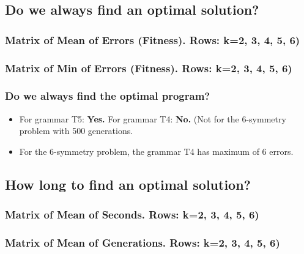 \documentclass[18pt,c]{beamer}
\makeatletter
\let\beamer@writeslidentry@miniframeson=\beamer@writeslidentry
\newcommand*{\miniframeson}{\let\beamer@writeslidentry=\beamer@writeslidentry@miniframeson}
\makeatother
\begin{document}
\subsection{Do we always find an optimal solution?}
 \begin{frame}
 \fontsize{8pt}{9pt}\selectfont
 \frametitle{ Matrix of Mean of Errors (Fitness).  Rows: k=2, 3, 4, 5, 6) }

 \label{ExpEMeanMatrixTable000.tex}  
 \end{frame}

 \begin{frame}
 \fontsize{8pt}{9pt}\selectfont
 \frametitle{ Matrix of Min of Errors (Fitness). Rows: k=2, 3, 4, 5, 6) }

 \label{ExpEMeanMatrixTable001.tex}  
 \end{frame}

\begin{frame}
\frametitle{
Do we always find the optimal program?
}
\begin{itemize}
\item For grammar T5: {\bf Yes.}
       For grammar T4: {\bf No.}
       (Not for the 6-symmetry problem with 500 generations.
\item For the 6-symmetry problem, the grammar T4 has maximum of 6 errors.
\end{itemize}
\end{frame}%
\miniframeson
\subsection{How long to find an optimal solution?}
 \begin{frame}
 \fontsize{8pt}{9pt}\selectfont
 \frametitle{ Matrix of Mean of Seconds.  Rows: k=2, 3, 4, 5, 6) }

 \label{ExpEMeanMatrixTable002.tex}  
 \end{frame}

 \begin{frame}
 \fontsize{8pt}{9pt}\selectfont
 \frametitle{ Matrix of Mean of Generations.  Rows: k=2, 3, 4, 5, 6) }

 \label{ExpEMeanMatrixTable003.tex}  
 \end{frame}
\end{document}
